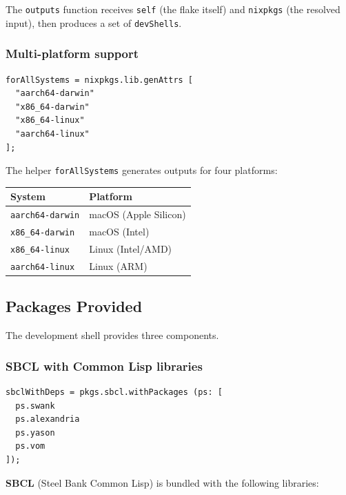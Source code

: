 \documentclass[a4paper,11pt]{article}
\begin{document}
The \texttt{outputs} function receives \texttt{self} (the flake itself) and
\texttt{nixpkgs} (the resolved input), then produces a set of \texttt{devShells}.

\subsubsection{Multi-platform support}

\begin{lstlisting}[style=nix]
forAllSystems = nixpkgs.lib.genAttrs [
  "aarch64-darwin"
  "x86_64-darwin"
  "x86_64-linux"
  "aarch64-linux"
];
\end{lstlisting}

The helper \texttt{forAllSystems} generates outputs for four platforms:

\begin{center}
\begin{tabular}{ll}
  \toprule
  \textbf{System} & \textbf{Platform} \\
  \midrule
  \texttt{aarch64-darwin} & macOS (Apple Silicon) \\
  \texttt{x86\_64-darwin} & macOS (Intel) \\
  \texttt{x86\_64-linux}  & Linux (Intel/AMD) \\
  \texttt{aarch64-linux}  & Linux (ARM) \\
  \bottomrule
\end{tabular}
\end{center}

\subsection{Packages Provided}

The development shell provides three components.

\subsubsection{SBCL with Common Lisp libraries}

\begin{lstlisting}[style=nix]
sbclWithDeps = pkgs.sbcl.withPackages (ps: [
  ps.swank
  ps.alexandria
  ps.yason
  ps.vom
]);
\end{lstlisting}

\textbf{SBCL} (Steel Bank Common Lisp) is bundled with the following libraries:
\end{document}
